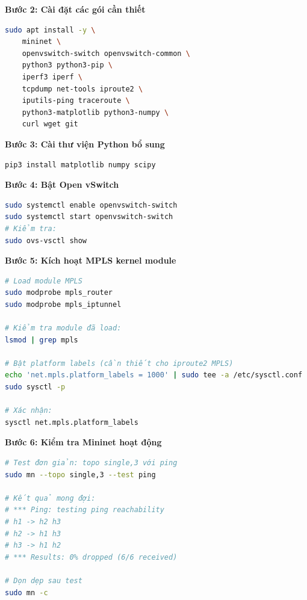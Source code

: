 \textbf{Bước 2: Cài đặt các gói cần thiết}

\begin{lstlisting}[language=bash, frame=single, basicstyle=\ttfamily\small]
sudo apt install -y \
    mininet \
    openvswitch-switch openvswitch-common \
    python3 python3-pip \
    iperf3 iperf \
    tcpdump net-tools iproute2 \
    iputils-ping traceroute \
    python3-matplotlib python3-numpy \
    curl wget git
\end{lstlisting}

\textbf{Bước 3: Cài thư viện Python bổ sung}

\begin{lstlisting}[language=bash, frame=single, basicstyle=\ttfamily\small]
pip3 install matplotlib numpy scipy
\end{lstlisting}

\textbf{Bước 4: Bật Open vSwitch}

\begin{lstlisting}[language=bash, frame=single, basicstyle=\ttfamily\small]
sudo systemctl enable openvswitch-switch
sudo systemctl start openvswitch-switch
# Kiểm tra:
sudo ovs-vsctl show
\end{lstlisting}

\textbf{Bước 5: Kích hoạt MPLS kernel module}

\begin{lstlisting}[language=bash, frame=single, basicstyle=\ttfamily\small]
# Load module MPLS
sudo modprobe mpls_router
sudo modprobe mpls_iptunnel

# Kiểm tra module đã load:
lsmod | grep mpls

# Bật platform labels (cần thiết cho iproute2 MPLS)
echo 'net.mpls.platform_labels = 1000' | sudo tee -a /etc/sysctl.conf
sudo sysctl -p

# Xác nhận:
sysctl net.mpls.platform_labels
\end{lstlisting}

\textbf{Bước 6: Kiểm tra Mininet hoạt động}

\begin{lstlisting}[language=bash, frame=single, basicstyle=\ttfamily\small]
# Test đơn giản: topo single,3 với ping
sudo mn --topo single,3 --test ping

# Kết quả mong đợi:
# *** Ping: testing ping reachability
# h1 -> h2 h3
# h2 -> h1 h3
# h3 -> h1 h2
# *** Results: 0% dropped (6/6 received)

# Dọn dẹp sau test
sudo mn -c
\end{lstlisting}

